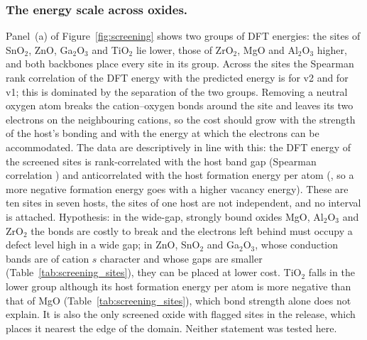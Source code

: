 \subsubsection{The energy scale across oxides.}
Panel~(a) of Figure~\ref{fig:screening} shows two groups of DFT energies: the sites of SnO$_2$, ZnO, Ga$_2$O$_3$ and TiO$_2$ lie lower, those of ZrO$_2$, MgO and Al$_2$O$_3$ higher, and both backbones place every site in its group. Across the \numScreeningDemoScopeNScreenedSites{} sites the Spearman rank correlation of the DFT energy with the predicted energy is \numScreeningDemoSummaryVTwoSpearmanAcrossSites{} for v2 and \numScreeningDemoSummaryVOneSpearmanAcrossSites{} for v1; this is dominated by the separation of the two groups. Removing a neutral oxygen atom breaks the cation--oxygen bonds around the site and leaves its two electrons on the neighbouring cations, so the cost should grow with the strength of the host's bonding and with the energy at which the electrons can be accommodated. The data are descriptively in line with this: the DFT energy of the screened sites is rank-correlated with the host band gap (Spearman correlation \numScreeningDemoDescriptiveSpearmanDftVsBandGap{}) and anticorrelated with the host formation energy per atom (\numScreeningDemoDescriptiveSpearmanDftVsHostFormationEnergy{}, so a more negative formation energy goes with a higher vacancy energy). These are ten sites in seven hosts, the sites of one host are not independent, and no interval is attached. Hypothesis: in the wide-gap, strongly bound oxides MgO, Al$_2$O$_3$ and ZrO$_2$ the bonds are costly to break and the electrons left behind must occupy a defect level high in a wide gap; in ZnO, SnO$_2$ and Ga$_2$O$_3$, whose conduction bands are of cation $s$ character and whose gaps are smaller (Table~\ref{tab:screening_sites}), they can be placed at lower cost. TiO$_2$ falls in the lower group although its host formation energy per atom is more negative than that of MgO (Table~\ref{tab:screening_sites}), which bond strength alone does not explain. It is also the only screened oxide with flagged sites in the release, which places it nearest the edge of the domain. Neither statement was tested here.

